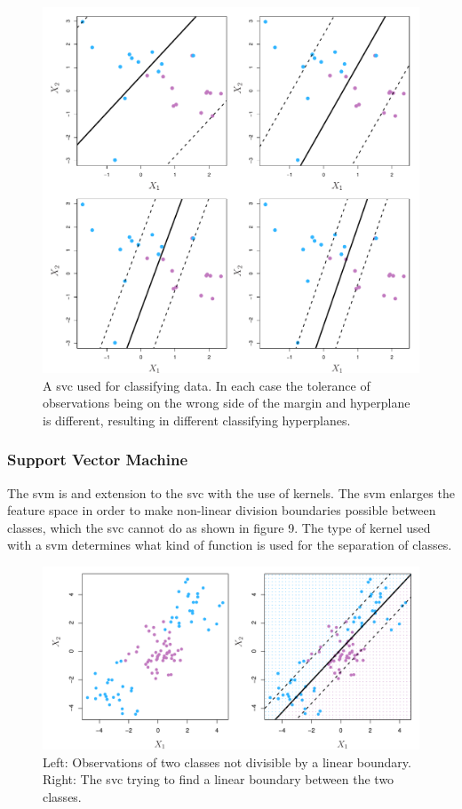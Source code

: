 \documentclass[11pt]{article}
\begin{document}
\begin{figure}[ht]
  \centering
  \includegraphics[width=12cm]{graphics/9_7.pdf}
  \caption{A \gls{svc} used for classifying data. In each case the tolerance of observations being on the wrong side of the margin and hyperplane is different, resulting in different classifying hyperplanes.\cite{jamesSupportVectorMachines}}
\end{figure}

\subsubsection{Support Vector Machine}
The \gls{svm} is and extension to the \gls{svc} with the use of kernels. The \gls{svm} enlarges the feature space in order to make non-linear division boundaries possible between classes, which the \gls{svc} cannot do as shown in figure 9. The type of kernel used with a \gls{svm}\cite{KernelMethod2021} determines what kind of function is used for the separation of classes\cite{SVMKernelsScikitlearn24}.\cite{jamesSupportVectorMachines}

\begin{figure}[ht]
  \centering
  \includegraphics[width=12cm]{graphics/9_8.pdf}
  \caption{Left: Observations of two classes not divisible by a linear boundary. Right: The \gls{svc} trying to find a linear boundary between the two classes.\cite{jamesSupportVectorMachines}}
\end{figure}
\end{document}
